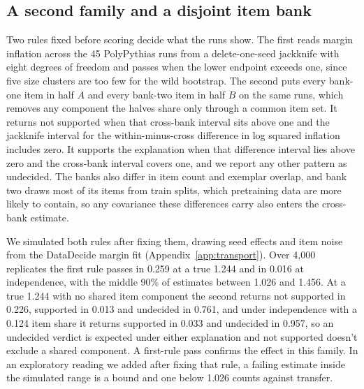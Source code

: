 \subsection{A second family and a disjoint item bank}
\label{sec:family}
Two rules fixed before scoring decide what the runs show. The first reads margin inflation across the 45 PolyPythias runs from a delete-one-seed jackknife with eight degrees of freedom and passes when the lower endpoint exceeds one, since five size clusters are too few for the wild bootstrap. The second puts every bank-one item in half $A$ and every bank-two item in half $B$ on the same runs, which removes any component the halves share only through a common item set. It returns not supported when that cross-bank interval sits above one and the jackknife interval for the within-minus-cross difference in log squared inflation includes zero. It supports the explanation when that difference interval lies above zero and the cross-bank interval covers one, and we report any other pattern as undecided. The banks also differ in item count and exemplar overlap, and bank two draws most of its items from train splits, which pretraining data are more likely to contain, so any covariance these differences carry also enters the cross-bank estimate.

We simulated both rules after fixing them, drawing seed effects and item noise from the DataDecide margin fit (Appendix~\ref{app:transport}). Over 4,000 replicates the first rule passes in 0.259 at a true 1.244 and in 0.016 at independence, with the middle 90\% of estimates between 1.026 and 1.456. At a true 1.244 with no shared item component the second returns not supported in 0.226, supported in 0.013 and undecided in 0.761, and under independence with a 0.124 item share it returns supported in 0.033 and undecided in 0.957, so an undecided verdict is expected under either explanation and not supported doesn't exclude a shared component. A first-rule pass confirms the effect in this family. In an exploratory reading we added after fixing that rule, a failing estimate inside the simulated range is a bound and one below 1.026 counts against transfer.


